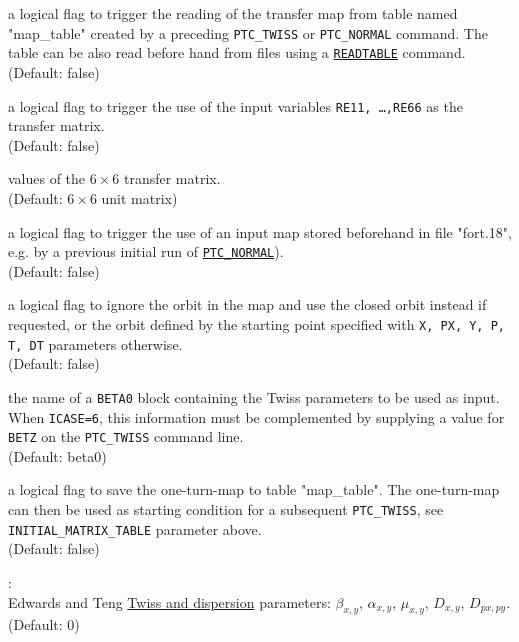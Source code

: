\begin{madlist}
  a logical flag to trigger the reading of the transfer map from table
  named "map\_table" created by a preceding \texttt{PTC\_TWISS} or
  \texttt{PTC\_NORMAL} command. The table can be also read 
  before hand from files using a \hyperref[sec:readtable]{\texttt{READTABLE}}
  command.\\ 
  (Default: false)
  
  a logical flag to trigger the use of the input variables \texttt{RE11,
    \ldots ,RE66} as the transfer matrix. \\
  (Default: false)

  values of the $6\times 6$ transfer matrix. \\ 
  (Default: $6\times 6$ unit matrix) 
  
  a logical flag to trigger the use of an input map stored beforehand in
  file "fort.18",  e.g. by a previous initial run of
  \hyperref[chap:ptc-normal]{\texttt{PTC\_NORMAL}}). \\
  (Default: false)

  a logical flag to ignore the orbit in the map and use the closed orbit
  instead if requested, or the orbit defined by the starting point
  specified with \texttt{X, PX, Y, P, T, DT} parameters otherwise. \\
  (Default: false)

  the name of a \texttt{BETA0} block containing the Twiss
  parameters to be used as input. When \texttt{ICASE=6}, this information
  must be complemented by supplying a value for \texttt{BETZ} on the
  \texttt{PTC\_TWISS} command line. \\
  (Default: beta0)

  a logical flag to save the one-turn-map to table
  "map\_table". The one-turn-map can then be used as starting condition
  for a subsequent \texttt{PTC\_TWISS}, see \texttt{INITIAL\_MATRIX\_TABLE}
  parameter above. \\ (Default: false)

   : \\
  Edwards and Teng \cite{edwards1973} 
  \hyperref[chap:twiss]{Twiss and dispersion} parameters:  
  $\beta_{x,y}$, $\alpha_{x,y}$, $\mu_{x,y}$, $D_{x,y}$, $D_{px,py}$.\\
  (Default: 0) 


\end{madlist}

